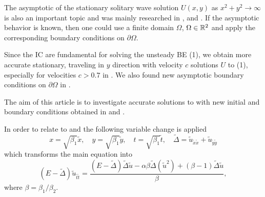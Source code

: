 \documentclass[11pt,a4paper,twoside]{article}
\begin{document}
The asymptotic of the stationary solitary wave solution $U(x,y)$ as $x^2+y^2 \rightarrow \infty$ is also an important topic and was mainly researched in \cite{chr-chr-07}, \cite{Ch2012} and \cite{BoundaryProblem}. If the asymptotic behavior is known, then one could use a finite domain $\Omega$,  $\Omega \in \mathbb{R}^2$ and apply the corresponding boundary conditions on $\partial \Omega$. 

Since the IC are  fundamental for solving the unsteady BE (1), we obtain more accurate stationary, traveling in $y$  direction with velocity $c$ solutions $U$ to (1), especially for velocities $c > 0.7$ in \cite{EllipticProblem}. We also found new asymptotic boundary conditions on $\partial \Omega$ in \cite{BoundaryProblem}.

The aim of this article is to investigate accurate solutions to  with new initial and boundary conditions obtained in \cite{EllipticProblem} and \cite{BoundaryProblem}. 

In order to relate to \cite{EllipticProblem} and \cite{BoundaryProblem}
the following variable change is applied
\begin{equation}\label{vc}
x = \sqrt{\beta_1} \tilde x, \quad y = \sqrt{\beta_1} \tilde y, \quad t = \sqrt{\beta_1} \tilde t, \quad \tilde \Delta = \tilde u_{\tilde x \tilde x} + \tilde u_{\tilde y \tilde y}
\end{equation}
which transforms the main equation   into 
\begin{equation}\label{eqVC}
(E-\tilde \Delta)  \tilde u_{\tilde t \tilde t} = \frac{(E-\tilde\Delta)\tilde\Delta \tilde u - \alpha \beta \tilde\Delta(\tilde u^2) + (\beta -1)\tilde\Delta \tilde u}{\beta},
\end{equation}
where $\beta = \beta_1 / \beta_2$. 
%
%
%
\end{document}
